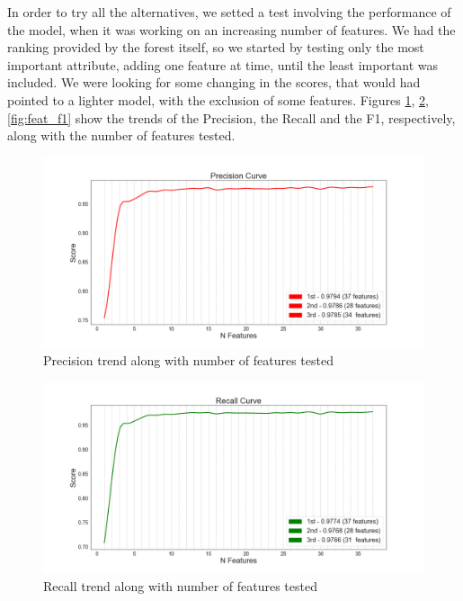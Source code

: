 In order to try all the alternatives, we setted a test involving the performance of the model, when it was working on an increasing number of features.
We had the ranking provided by the forest itself, so we started by testing only the most important attribute, adding one feature at time, until the least important was included.
We were looking for some changing in the scores, that would had pointed to a lighter model, with the exclusion of some features.
Figures \ref{fig:feat_prec}, \ref{fig:feat_rec}, \ref{fig:feat_f1} show the trends of the Precision, the Recall and the F1, respectively, along with the number of features tested.
 \begin{figure}[htp!]
 	\centering
 	\includegraphics[width=\columnwidth]{chapter5/figure/precision_along_features.png}
 	\caption{Precision trend along with number of features tested}
 	\label{fig:feat_prec}
 \end{figure}
\begin{figure}[htp!]
	\centering
	\includegraphics[width=\columnwidth]{chapter5/figure/recall_along_features.png}
	\caption{Recall trend along with number of features tested}
	\label{fig:feat_rec}
\end{figure}
